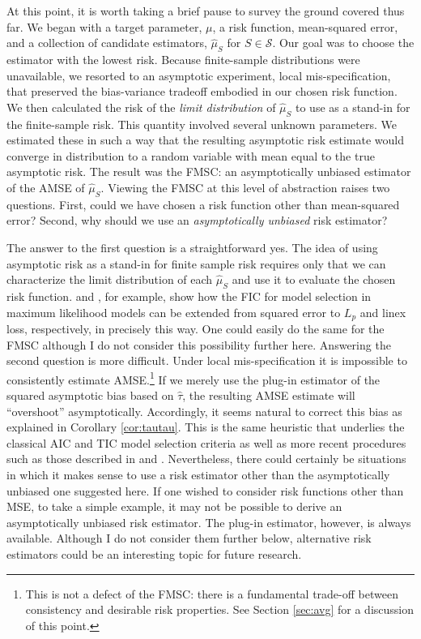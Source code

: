 At this point, it is worth taking a brief pause to survey the ground covered thus far.
We began with a target parameter, $\mu$, a risk function, mean-squared error, and a collection of candidate estimators, $\widehat{\mu}_S$ for $S\in\mathscr{S}$. 
Our goal was to choose the estimator with the lowest risk.
Because finite-sample distributions were unavailable, we resorted to an asymptotic experiment, local mis-specification, that preserved the bias-variance tradeoff embodied in our chosen risk function.
We then calculated the risk of the \emph{limit distribution} of $\widehat{\mu}_S$ to use as a stand-in for the finite-sample risk. 
This quantity involved several unknown parameters.
We estimated these in such a way that the resulting asymptotic risk estimate would converge in distribution to a random variable with mean equal to the true asymptotic risk.
The result was the FMSC: an asymptotically unbiased estimator of the AMSE of $\widehat{\mu}_S$.
Viewing the FMSC at this level of abstraction raises two questions.
First, could we have chosen a risk function other than mean-squared error?
Second, why should we use an \emph{asymptotically unbiased} risk estimator? 

The answer to the first question is a straightforward yes.
The idea of using asymptotic risk as a stand-in for finite sample risk requires only that we can characterize the limit distribution of each $\widehat{\mu}_S$ and use it to evaluate the chosen risk function.
\cite{Claeskens2006} and \cite{ClaeskensHjort2008}, for example, show how the FIC for model selection in maximum likelihood models can be extended from squared error to $L_p$ and linex loss, respectively, in precisely this way.
One could easily do the same for the FMSC although I do not consider this possibility further here.
Answering the second question is more difficult.
Under local mis-specification it is impossible to consistently estimate AMSE.\footnote{This is not a defect of the FMSC: there is a fundamental trade-off between consistency and desirable risk properties. See Section \ref{sec:avg} for a discussion of this point.}
If we merely use the plug-in estimator of the squared asymptotic bias based on $\widehat{\tau}$, the resulting AMSE estimate will ``overshoot'' asymptotically.
Accordingly, it seems natural to correct this bias as explained in Corollary \ref{cor:tautau}.
This is the same heuristic that underlies the classical AIC and TIC model selection criteria as well as more recent procedures such as those described in \cite{ClaeskensHjort2003} and \cite{Schorfheide2005}.
Nevertheless, there could certainly be situations in which it makes sense to use a risk estimator other than the asymptotically unbiased one suggested here.
If one wished to consider risk functions other than MSE, to take a simple example, it may not be possible to derive an asymptotically unbiased risk estimator.
The plug-in estimator, however, is always available.
Although I do not consider them further below, alternative risk estimators could be an interesting topic for future research.
